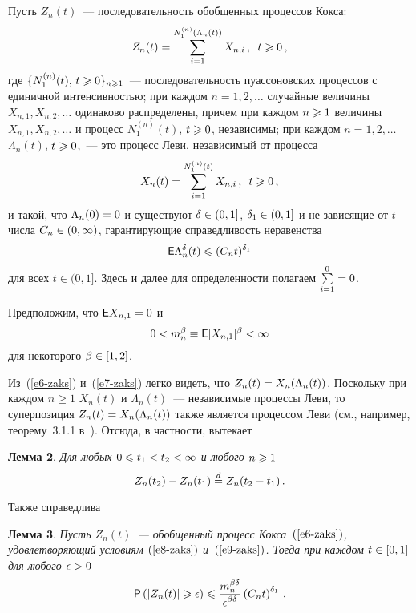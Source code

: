 \begin{multicols}{2}
Пусть $Z_n(t)$~--- последовательность обобщенных процессов Кокса:
\begin{equation}
Z_n(t)=\sum\limits_{i=1}^{N^{(n)}_{1}(\Lambda_n(t))}X_{n,i}\,,\enskip
t\geqslant0\,,\label{e6-zaks}
\end{equation}
где
$\{N^{(n)}_{1}(t),\, t\hm\geqslant0\}_{n\geqslant1}$~--- последовательность
пуассоновских процессов с единичной интен\-сив\-ностью; при каждом
$n=1,2,\ldots$ случайные величины $X_{n,1},X_{n,2},\ldots$ одинаково
распределены, \mbox{причем} при каждом $n\hm\geqslant1$ величины
$X_{n,1},X_{n,2},\ldots$ и процесс $N^{(n)}_{1}(t)$, $t\hm\geqslant0$,
независимы; при каждом $n=1,2,\ldots$ $\Lambda_n(t)$, $t\hm\geqslant0$,~--- это
процесс Леви, независимый от процесса
\begin{equation}
X_n(t)=\sum\limits_{i=1}^{N^{(n)}_{1}(t)}X_{n,i}\,,\enskip t\geqslant 0\,,\label{e7-zaks}
\end{equation}
и такой, что $\Lambda_n(0)\hm=0$ и существуют $\delta\hm\in(0,1]$,
$\delta_1\hm\in(0,1]$ и не зависящие от $t$ числа $C_n\hm\in(0,\infty)$,
гарантирующие справедливость неравенства
\begin{equation}
{\sf E}\Lambda^{\delta}_n(t)\leqslant (C_nt)^{\delta_1}\label{e8-zaks}
\end{equation}
для всех $t\in(0,1]$. Здесь и далее для определенности полагаем
$\sum\limits_{i=1}^0\hm=0$.


Предположим, что ${\sf E}X_{n,1}\hm=0$ и
\begin{equation}
0<m_n^{\beta}\equiv{\sf E}|X_{n,1}|^{\beta}<\infty
\label{e9-zaks}
\end{equation}
для некоторого $\beta\hm\in[1,2]$.

Из~(\ref{e6-zaks}) и~(\ref{e7-zaks}) легко видеть, что $Z_n(t)\hm=X_n(\Lambda_n(t))$. Поскольку
при каждом $n\geqslant1$ $X_n(t)$ и $\Lambda_n(t)$~--- независимые процессы
Леви, то суперпозиция $Z_n(t)\hm=X_n(\Lambda_n(t))$ также является
процессом Леви (см., например, теорему~3.1.1 в~\cite{Kashcheev2001}).
Отсюда, в частности, вытекает

\smallskip

\noindent
\textbf{Лемма 2}. \textit{Для любых $0\hm\leqslant t_1\hm<t_2\hm<\infty$ и любого
$n\hm\geqslant1$}
$$
Z_n(t_2)-Z_n(t_1)\stackrel{d}{=} Z_n(t_2-t_1)\,.
$$

\smallskip

Также справедлива

\smallskip

\noindent
\textbf{Лемма 3}. \textit{Пусть $Z_n(t)$~--- обобщенный процесс Кокса~$(\ref{e6-zaks})$,
удовлетворяющий условиям $(\ref{e8-zaks})$ и~$(\ref{e9-zaks})$. Тогда при каждом
$t\hm\in[0,1]$ для любого $\epsilon\hm>0$}
$$
{\sf P}\left(|Z_n(t)|\geqslant\epsilon\right)\leqslant
\displaystyle\frac{\displaystyle m_n^{\beta\delta}\mathstrut}{\displaystyle \epsilon^{\beta\delta}\mathstrut} \left(C_nt\right)^{\delta_1}\,.
$$


\end{multicols}
